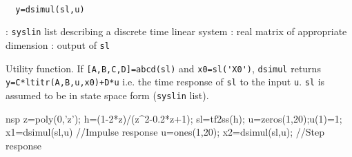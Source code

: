 \begin{mandesc}
   \\ %
\end{mandesc}
\begin{calling_sequence}
\begin{verbatim}
  y=dsimul(sl,u)  
\end{verbatim}
\end{calling_sequence}
\begin{parameters}
  \begin{varlist}
    : \verb!syslin! list describing a discrete time linear system
    : real matrix of appropriate dimension
    : output of \verb!sl!
  \end{varlist}
\end{parameters}
\begin{mandescription}
  Utility function.  If \verb![A,B,C,D]=abcd(sl)! and \verb!x0=sl('X0')!,
  \verb!dsimul! returns \verb!y=C*ltitr(A,B,u,x0)+D*u! i.e.  the time response
  of \verb!sl! to the input \verb!u!.  \verb!sl! is assumed to be in state space
  form (\verb!syslin! list).
\end{mandescription}
\begin{examples}
  \begin{mintednsp}{nsp}
    z=poly(0,'z');
    h=(1-2*z)/(z^2-0.2*z+1);
    sl=tf2ss(h);
    u=zeros(1,20);u(1)=1;
    x1=dsimul(sl,u)   //Impulse response
    u=ones(1,20);
    x2=dsimul(sl,u);  //Step response
  \end{mintednsp}
\end{examples}
\begin{manseealso}
      
\end{manseealso}
